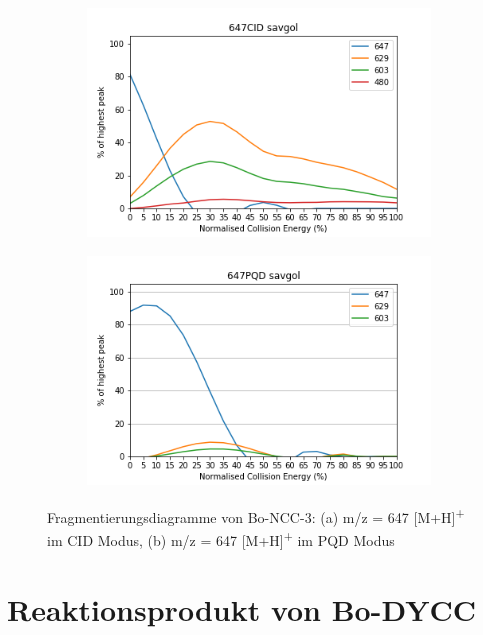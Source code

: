 \begin{figure}[!htbp]
  \begin{subfigure}[b]{0.5\textwidth}
    \includegraphics[width=\textwidth]{content/Anhang/ESIMS/Bo-NCC-3/647CID-647savgol.png}
    \caption{}
  \end{subfigure}
  \hfill
  \begin{subfigure}[b]{0.5\textwidth}
    \includegraphics[width=\textwidth]{content/Anhang/ESIMS/Bo-NCC-3/647PQD-647savgol.png}
    \caption{}
  \end{subfigure}
  
  \caption[Fragmentierungsdiagramme von Bo-NCC-3, Quelle: Autor]{Fragmentierungsdiagramme von Bo-NCC-3: (a) m/z = 647 [M+H]\textsuperscript{+} im CID Modus, (b) m/z = 647 [M+H]\textsuperscript{+} im PQD Modus}
\end{figure}

\section{Reaktionsprodukt von Bo-DYCC}


